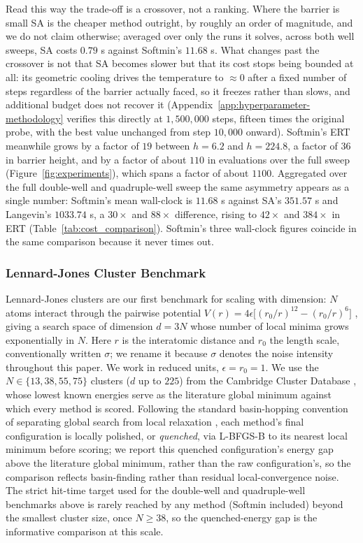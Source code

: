 \documentclass{article}
\theoremstyle{plain}
\theoremstyle{definition}
\theoremstyle{remark}
\begin{document}
Read this way the trade-off is a crossover, not a ranking. Where the barrier is small SA is the cheaper method outright, by roughly an order of magnitude, and we do not claim otherwise; averaged over only the runs it solves, across both well sweeps, SA costs $0.79$ s against Softmin's $11.68$ s. What changes past the crossover is not that SA becomes slower but that its cost stops being bounded at all: its geometric cooling drives the temperature to $\approx0$ after a fixed number of steps regardless of the barrier actually faced, so it freezes rather than slows, and additional budget does not recover it (Appendix~\ref{app:hyperparameter-methodology} verifies this directly at $1{,}500{,}000$ steps, fifteen times the original probe, with the best value unchanged from step $10{,}000$ onward). Softmin's ERT meanwhile grows by a factor of $19$ between $h=6.2$ and $h=224.8$, a factor of $36$ in barrier height, and by a factor of about $110$ in evaluations over the full sweep (Figure~\ref{fig:experiments}), which spans a factor of about $1100$. Aggregated over the full double-well and quadruple-well sweep the same asymmetry appears as a single number: Softmin's mean wall-clock is $11.68$ s against SA's $351.57$ s and Langevin's $1033.74$ s, a $30\times$ and $88\times$ difference, rising to $42\times$ and $384\times$ in ERT (Table~\ref{tab:cost_comparison}). Softmin's three wall-clock figures coincide in the same comparison because it never times out.

\subsubsection{Lennard-Jones Cluster Benchmark}
\label{apx:lj}

Lennard-Jones clusters are our first benchmark for scaling with dimension: $N$ atoms interact through the pairwise potential $V(r)=4\epsilon\bigl[(r_0/r)^{12}-(r_0/r)^6\bigr]$ \cite{jones1924determination}, giving a search space of dimension $d=3N$ whose number of local minima grows exponentially in $N$. Here $r$ is the interatomic distance and $r_0$ the length scale, conventionally written $\sigma$; we rename it because $\sigma$ denotes the noise intensity throughout this paper. We work in reduced units, $\epsilon=r_0=1$. We use the $N\in\{13,38,55,75\}$ clusters ($d$ up to $225$) from the Cambridge Cluster Database \cite{wales1997global}, whose lowest known energies serve as the literature global minimum against which every method is scored. Following the standard basin-hopping convention of separating global search from local relaxation \cite{wales1997global}, each method's final configuration is locally polished, or \emph{quenched}, via L-BFGS-B to its nearest local minimum before scoring; we report this quenched configuration's energy gap above the literature global minimum, rather than the raw configuration's, so the comparison reflects basin-finding rather than residual local-convergence noise. The strict hit-time target used for the double-well and quadruple-well benchmarks above is rarely reached by any method (Softmin included) beyond the smallest cluster size, once $N\geq38$, so the quenched-energy gap is the informative comparison at this scale.
\end{document}
